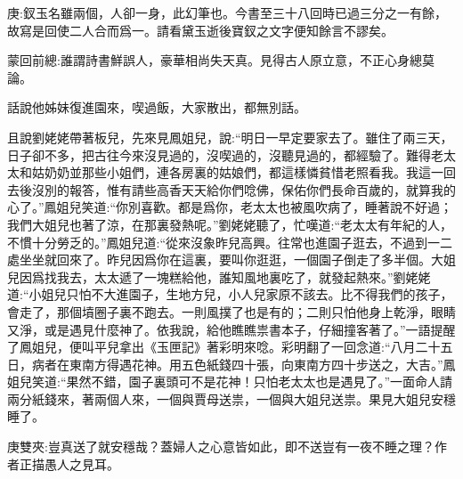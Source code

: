 

\begin{parag}
    \begin{note}庚:釵玉名雖兩個，人卻一身，此幻筆也。今書至三十八回時已過三分之一有餘，故寫是回使二人合而爲一。請看黛玉逝後寶釵之文字便知餘言不謬矣。\end{note}
\end{parag}


\begin{parag}
    \begin{note}蒙回前總:誰謂詩書鮮誤人，豪華相尚失天真。見得古人原立意，不正心身總莫論。\end{note}
\end{parag}


\begin{parag}
    話說他姊妹復進園來，喫過飯，大家散出，都無別話。
\end{parag}


\begin{parag}
    且說劉姥姥帶著板兒，先來見鳳姐兒，說:“明日一早定要家去了。雖住了兩三天，日子卻不多，把古往今來沒見過的，沒喫過的，沒聽見過的，都經驗了。難得老太太和姑奶奶並那些小姐們，連各房裏的姑娘們，都這樣憐貧惜老照看我。我這一回去後沒別的報答，惟有請些高香天天給你們唸佛，保佑你們長命百歲的，就算我的心了。”鳳姐兒笑道:“你別喜歡。都是爲你，老太太也被風吹病了，睡著說不好過；我們大姐兒也著了涼，在那裏發熱呢。”劉姥姥聽了，忙嘆道:“老太太有年紀的人，不慣十分勞乏的。”鳳姐兒道:“從來沒象昨兒高興。往常也進園子逛去，不過到一二處坐坐就回來了。昨兒因爲你在這裏，要叫你逛逛，一個園子倒走了多半個。大姐兒因爲找我去，太太遞了一塊糕給他，誰知風地裏吃了，就發起熱來。”劉姥姥道:“小姐兒只怕不大進園子，生地方兒，小人兒家原不該去。比不得我們的孩子，會走了，那個墳圈子裏不跑去。一則風撲了也是有的；二則只怕他身上乾淨，眼睛又淨，或是遇見什麼神了。依我說，給他瞧瞧祟書本子，仔細撞客著了。”一語提醒了鳳姐兒，便叫平兒拿出《玉匣記》著彩明來唸。彩明翻了一回念道:“八月二十五日，病者在東南方得遇花神。用五色紙錢四十張，向東南方四十步送之，大吉。”鳳姐兒笑道:“果然不錯，園子裏頭可不是花神！只怕老太太也是遇見了。”一面命人請兩分紙錢來，著兩個人來，一個與賈母送祟，一個與大姐兒送祟。果見大姐兒安穩睡了。\begin{note}庚雙夾:豈真送了就安穩哉？蓋婦人之心意皆如此，即不送豈有一夜不睡之理？作者正描愚人之見耳。\end{note}
\end{parag}


